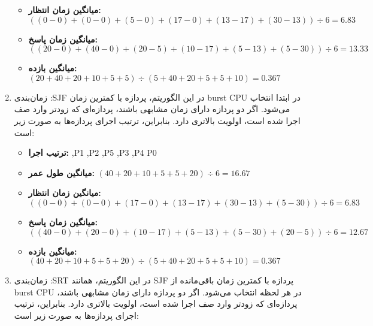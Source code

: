 \begin{qsolve}
\begin{enumerate}
\begin{itemize}
			\item \textbf{میانگین زمان انتظار: }
			$ ((0-0) + (0-0) + (5-0) + (17-0) + (13-17) + (30-13)) \div 6 = 6.83 $
			
			\item \textbf{میانگین زمان پاسخ: }
			$ ((20-0) + (40-0) + (20-5) + (10-17) + (5-13) + (5-30)) \div 6 = 13.33 $
			
			\item \textbf{میانگین بازده: }
			$ (20 + 40 + 20 + 10 + 5 + 5) \div (5 + 40 + 20 + 5 + 5 + 10) = 0.367 $
		\end{itemize}
		
		
		
		\item زمان‌بندی :SJF  در این الگوریتم، پردازه با کمترین زمان burst CPU در ابتدا انتخاب می‌شود. اگر دو پردازه دارای زمان مشابهی باشند، پردازه‌ای که زودتر وارد صف اجرا شده است، اولویت بالاتری دارد. بنابراین، ترتیب اجرای پردازه‌ها به صورت زیر است:
		
		\begin{itemize}
			\item \textbf{ترتیب اجرا: },P1 ,P2 ,P5 ,P3 ,P4 P0
			
			\item \textbf{میانگین طول عمر: }
			$ (40 + 20 + 10 + 5 + 5 + 20) \div 6 = 16.67$
			
			\item \textbf{میانگین زمان انتظار: }
			$ ((0-0) + (0-0) + (17-0) + (13-17) + (30-13) + (5-30)) \div 6 = 6.83 $
			
			\item \textbf{میانگین زمان پاسخ: }
			$ ((40-0) + (20-0) + (10-17) + (5-13) + (5-30) + (20-5)) \div 6 = 12.67 $
			
			\item \textbf{میانگین بازده: }
			$ (40 + 20 + 10 + 5 + 5 + 20) \div (5 + 40 + 20 + 5 + 5 + 10) = 0.367 $
		\end{itemize}


		
		\item زمان‌بندی :SRT
		 در این الگوریتم، همانند SJF پردازه با کمترین زمان باقی‌مانده از burst CPU در هر لحظه انتخاب می‌شود. اگر دو پردازه دارای زمان مشابهی باشند، پردازه‌ای که زودتر وارد صف اجرا شده است، اولویت بالاتری دارد. بنابراین، ترتیب اجرای پردازه‌ها به صورت زیر است:
		 
	\end{enumerate}
\end{qsolve}

